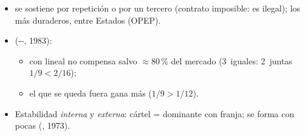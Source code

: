 \documentclass{article}
\begin{document}
\begin{columnas}
\begin{itemize}
\begin{itemize}
  \item se sostiene por repetición o por un tercero (contrato imposible: es ilegal); los más duraderos, entre Estados (OPEP).
  \end{itemize}
\end{itemize}
\begin{itemize}
\item {} (--, 1983):
  \begin{itemize}
  \item con  lineal no compensa salvo $\approx$80\,\% del mercado (3~iguales: 2~juntas $1/9<2/16$);
  \item el que se queda fuera gana más ($1/9>1/12$).
  \end{itemize}
\item Estabilidad \emph{interna} y \emph{externa}: cártel = dominante con franja; se forma con pocas (, 1973).
\end{itemize}


\end{columnas}
\end{document}
